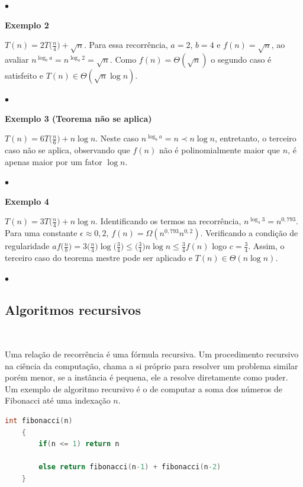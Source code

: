 {\raggedleft $\bullet $ \par}

\textbf{Exemplo 2}

$T(n) = 2T\Bigr(\frac{n}{4}\Bigr) + \sqrt{n}$. Para essa recorrência, $a = 2$, $b = 4$ e $f(n) = \sqrt{n}$, ao avaliar $n^{\log_ba}=n^{\log_4 2} = \sqrt{n}$. Como $f(n) = \Theta(\sqrt{n})$ o segundo caso é satisfeito e $T(n) \in \Theta(\sqrt{n}\log n)$.

{\raggedleft $\bullet$ \par}

\textbf{Exemplo 3 (Teorema não se aplica)}

$T(n) = 6T\Bigr(\frac{n}{6}\Bigr) + {n \log n}$. Neste caso $n^{\log_ba} = n \prec n \log n$, entretanto, o terceiro caso não se aplica, observando que $f(n)$ não é polinomialmente maior que $n$, é apenas maior por um fator $\log n$.

{\raggedleft $\bullet$ \par}

\textbf{Exemplo 4}

$T(n) = 3T\Bigr(\frac{n}{4}\Bigr) + {n \log n}$. Identificando os termos na recorrência, $n^{\log_4 3} = n^{0,793}$. Para uma constante $\epsilon \approx 0,2$, $f(n) = \Omega(n^{0,793}n^{0,2})$. Verificando a condição de regularidade $af\Bigr(\frac{n}{b}\Bigr) = 3\Bigr(\frac{n}{4}\Bigr)\log\Bigr(\frac{3}{4}\Bigr) \leq \Bigr(\frac{3}{4}\Bigr) n \log n \leq \frac{3}{4}f(n)$ logo $c=\frac{3}{4}$. Assim, o terceiro caso do teorema mestre pode ser aplicado e $T(n) \in \Theta (n \log n)$.

{\raggedleft $\bullet$ \par}

\subsection{Algoritmos recursivos}
\

Uma relação de recorrência é uma fórmula recursiva. Um procedimento recursivo na ciência da computação, chama a si próprio para resolver um problema similar porém menor, se a instância é pequena, ele a resolve diretamente como puder. Um exemplo de algoritmo recursivo é o de computar a soma dos números de Fibonacci até uma indexação $n$.

\begin{lstlisting}[language=C, frame=single]
    int fibonacci(n)
    {
        if(n <= 1) return n

        else return fibonacci(n-1) + fibonacci(n-2)
    }
\end{lstlisting}

